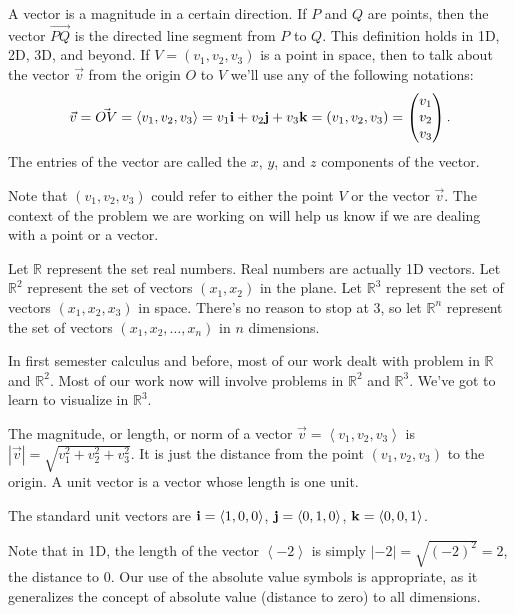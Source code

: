 \begin{definition}
A vector is a magnitude in a certain direction.  
If $P$ and $Q$ are points, then the vector $\vec{PQ}$ is the directed line segment from $P$ to $Q$. This definition holds in 1D, 2D, 3D, and beyond.  
If $V=(v_1,v_2,v_3)$ is a point in space, then to talk about the vector $\vec v$ from the origin $O$ to $V$ we'll use any of the following notations:
$$\vec v = \vec{OV}=\left<v_1,v_2,v_3\right> 
= v_1{\bf i}+v_2{\bf j}+v_3{\bf k} 
= (v_1,v_2,v_3) 
= \begin{pmatrix}v_1\\ v_2\\ v_3\end{pmatrix}
.$$
The entries of the vector are called the $x$, $y$, and $z$ components of the vector. 
\end{definition}

Note that $(v_1,v_2,v_3)$ could refer to either the point $V$ or the vector $\vec v$. The context of the problem we are working on will help us know if we are dealing with a point or a vector.

\begin{definition}
Let $\mathbb{R}$ represent the set real numbers. Real numbers are actually 1D vectors.  
Let $\mathbb{R}^2$ represent the set of vectors $(x_1,x_2)$ in the plane.
Let $\mathbb{R}^3$ represent the set of vectors $(x_1,x_2,x_3)$ in space. There's no reason to stop at 3, so let $\mathbb{R}^n$ represent the set of vectors $(x_1,x_2,\ldots,x_n)$ in $n$ dimensions.
\end{definition}
In first semester calculus and before, most of our work dealt with problem in $\mathbb{R}$ and $\mathbb{R}^2$. Most of our work now will involve problems in $\mathbb{R}^2$ and $\mathbb{R}^3$. We've got to learn to visualize in $\mathbb{R}^3$.

\begin{definition}
The magnitude, or length, or norm of a vector $\vec v = \left<v_1,v_2,v_3\right>$ is $|\vec v| = \sqrt{v_1^2+v_2^2+v_3^2}$. It is just the distance from the point $(v_1,v_2,v_3)$ to the origin. A unit vector is a vector whose length is one unit. 

The standard unit vectors are ${\bf i}=\left<1,0,0\right>$, ${\bf j}=\left<0,1,0\right>$, ${\bf k}=\left<0,0,1\right>$. 
\end{definition}
Note that in 1D, the length of the vector $\left<-2\right>$ is simply $|-2|=\sqrt{(-2)^2}=2$, the distance to 0. Our use of the absolute value symbols is appropriate, as it generalizes the concept of absolute value (distance to zero) to all dimensions.


